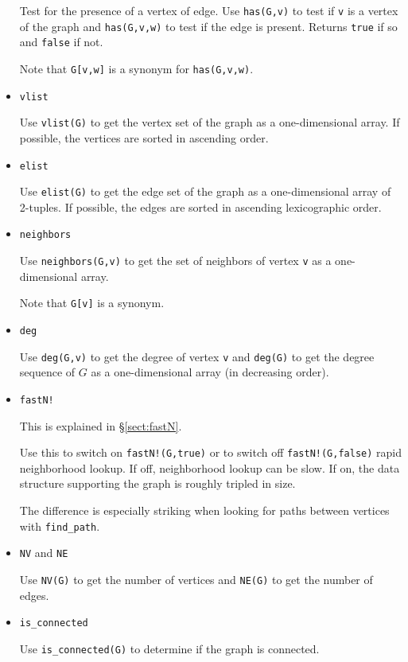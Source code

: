 \documentclass[oneside]{amsart}
\begin{document}
\begin{itemize}
  Test for the presence of a vertex of edge. Use \verb|has(G,v)| to
  test if \verb|v| is a vertex of the graph and \verb|has(G,v,w)| to
  test if the edge is present. Returns \verb|true| if so and
  \verb|false| if not.

  Note that \verb|G[v,w]| is a synonym for \verb|has(G,v,w)|.

\item \verb|vlist|

  Use \verb|vlist(G)| to get the vertex set of the graph as a
  one-dimensional array. If possible, the vertices are sorted in
  ascending order.

\item \verb|elist|

  Use \verb|elist(G)| to get the edge set of the graph as a
  one-dimensional array of 2-tuples. If possible, the edges are sorted
  in ascending lexicographic order.

\item \verb|neighbors|

  Use \verb|neighbors(G,v)| to get the set of neighbors of vertex
  \verb|v| as a one-dimensional array.

  Note that \verb|G[v]| is a synonym.

\item \verb|deg|

  Use \verb|deg(G,v)| to get the degree of vertex \verb|v| and
  \verb|deg(G)| to get the degree sequence of $G$ as a one-dimensional
  array (in decreasing order).

\item \verb|fastN!|

  This is explained in \S\ref{sect:fastN}.

  Use this to switch on \verb|fastN!(G,true)| or to switch off
  \verb|fastN!(G,false)| rapid neighborhood lookup. If off,
  neighborhood lookup can be slow. If on, the data structure
  supporting the graph is roughly tripled in size.

  The difference is especially striking when looking for paths between
  vertices with \verb|find_path|.


\item \verb|NV| and \verb|NE|

  Use \verb|NV(G)| to get the number of vertices and \verb|NE(G)| to
  get the number of edges.

\item \verb|is_connected|

  Use \verb|is_connected(G)| to determine if the graph is connected.


\end{itemize}
\end{document}
